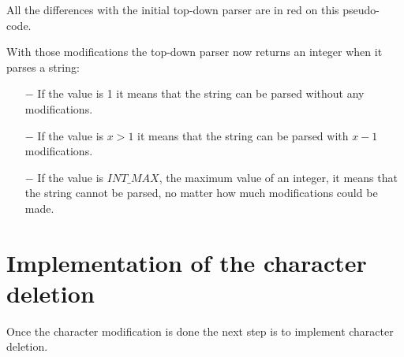 All the differences with the initial top-down parser are in red on this pseudo-code.

With those modifications the top-down parser now returns an integer when it parses a string:
\begin{itemize}
    \item[$-$] If the value is 1 it means that the string can be parsed without any modifications.
    \item[$-$] If the value is $x > 1$ it means that the string can be parsed with $x - 1$ modifications.
    \item[$-$] If the value is $INT\_MAX$, the maximum value of an integer, it means that the string cannot be parsed, no matter how much modifications could be made.
\end{itemize}

\section{Implementation of the character deletion}

Once the character modification is done the next step is to implement character deletion.


